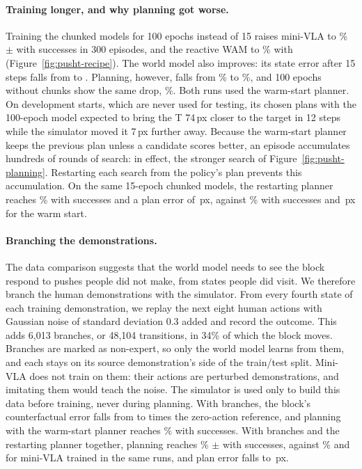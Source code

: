 \documentclass[11pt]{article}
\begin{document}
\paragraph{Training longer, and why planning got worse.} Training the chunked models for 100 epochs instead of 15 raises mini-VLA to \PTchunkEpochsVla\% $\pm$ \PTchunkEpochsVlaSd{} with \PTchunkEpochsVlaSucc{} successes in 300 episodes, and the reactive WAM to \PTchunkEpochsWam\% with \PTchunkEpochsWamSucc{} (Figure~\ref{fig:pusht-recipe}). The world model also improves: its state error after 15 steps falls from \PTchunkStateFifteen{} to \PTchunkEpochsStateFifteen. Planning, however, falls from \PTchunkPlan\% to \PTchunkEpochsPlan\%, and 100 epochs without chunks show the same drop, \PTepochsPlan\%. Both runs used the warm-start planner. On development starts, which are never used for testing, its chosen plans with the 100-epoch model expected to bring the T 74\,px closer to the target in 12 steps while the simulator moved it 7\,px further away. Because the warm-start planner keeps the previous plan unless a candidate scores better, an episode accumulates hundreds of rounds of search: in effect, the stronger search of Figure~\ref{fig:pusht-planning}. Restarting each search from the policy's plan prevents this accumulation. On the same 15-epoch chunked models, the restarting planner reaches \PTchunkRestartPlan\% with \PTchunkRestartPlanSucc{} successes and a plan error of \PTchunkRestartPlanPlanErr\,px, against \PTchunkRestartPlanWarm\% with \PTchunkRestartPlanWarmSucc{} successes and \PTchunkRestartPlanWarmPlanErr\,px for the warm start.

\paragraph{Branching the demonstrations.} The data comparison suggests that the world model needs to see the block respond to pushes people did not make, from states people did visit. We therefore branch the human demonstrations with the simulator. From every fourth state of each training demonstration, we replay the next eight human actions with Gaussian noise of standard deviation 0.3 added and record the outcome. This adds 6,013 branches, or 48,104 transitions, in 34\% of which the block moves. Branches are marked as non-expert, so only the world model learns from them, and each stays on its source demonstration's side of the train/test split. Mini-VLA does not train on them: their actions are perturbed demonstrations, and imitating them would teach the noise. The simulator is used only to build this data before training, never during planning. With branches, the block's counterfactual error falls from \PTchunkCfBlockRatio{} to \PTchunkBranchCfBlockRatio{} times the zero-action reference, and planning with the warm-start planner reaches \PTchunkBranchPlan\% with \PTchunkBranchPlanSucc{} successes. With branches and the restarting planner together, planning reaches \PTbranchRestartPlan\% $\pm$ \PTbranchRestartPlanSd{} with \PTbranchRestartPlanSucc{} successes, against \PTbranchRestartVla\% and \PTbranchRestartVlaSucc{} for mini-VLA trained in the same runs, and plan error falls to \PTbranchRestartPlanPlanErr\,px.
\end{document}
